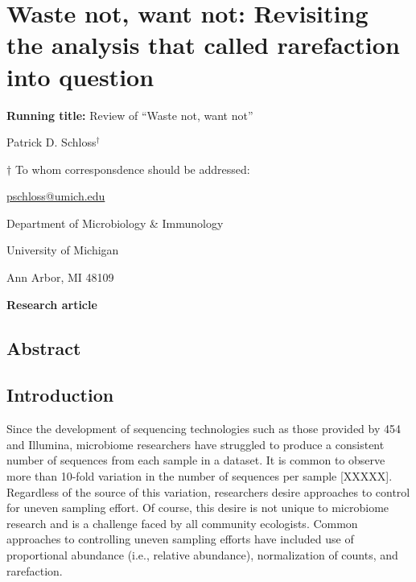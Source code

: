 \documentclass[
]{article}
\author{}
\date{\vspace{-2.5em}}
\begin{document}
\hypertarget{waste-not-want-not-revisiting-the-analysis-that-called-rarefaction-into-question}{%
\section{Waste not, want not: Revisiting the analysis that called
rarefaction into
question}\label{waste-not-want-not-revisiting-the-analysis-that-called-rarefaction-into-question}}

\vspace{20mm}

\textbf{Running title:} Review of ``Waste not, want not''

\vspace{20mm}

Patrick D. Schloss\({^\dagger}\)

\vspace{40mm}

\({\dagger}\) To whom corresponsdence should be addressed:

\href{mailto:pschloss@umich.edu}{pschloss@umich.edu}

Department of Microbiology \& Immunology

University of Michigan

Ann Arbor, MI 48109

\vspace{20mm}

\textbf{Research article}

\newpage

\hypertarget{abstract}{%
\subsection{Abstract}\label{abstract}}

\newpage

\hypertarget{introduction}{%
\subsection{Introduction}\label{introduction}}

Since the development of sequencing technologies such as those provided
by 454 and Illumina, microbiome researchers have struggled to produce a
consistent number of sequences from each sample in a dataset. It is
common to observe more than 10-fold variation in the number of sequences
per sample {[}XXXXX{]}. Regardless of the source of this variation,
researchers desire approaches to control for uneven sampling effort. Of
course, this desire is not unique to microbiome research and is a
challenge faced by all community ecologists. Common approaches to
controlling uneven sampling efforts have included use of proportional
abundance (i.e., relative abundance), normalization of counts, and
rarefaction.
\end{document}
